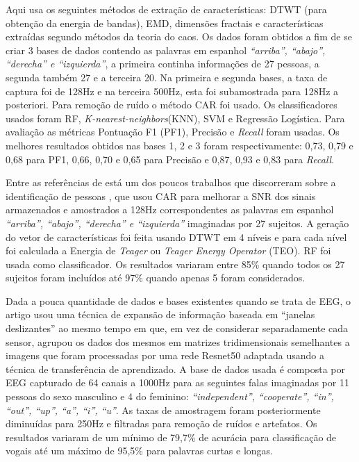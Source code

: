 			\par Aqui \cite{Hernandez-Del-ToroTonatiuh2021TaEB} usa os seguintes métodos de extração de características: DTWT (para obtenção da energia de bandas), EMD, dimensões fractais e características extraídas segundo métodos da teoria do caos. Os dados foram obtidos a fim de se criar 3 bases de dados contendo as palavras em espanhol \textit{``arriba'', ``abajo'', ``derecha'' e ``izquierda''}, a primeira continha informações de 27 pessoas, a segunda também 27 e a terceira 20. Na primeira e segunda bases, a taxa de captura foi de 128Hz e na terceira 500Hz, esta foi subamostrada para 128Hz a posteriori. Para remoção de ruído o método CAR foi usado. Os classificadores usados foram RF, \textit{K-nearest-neighbors}(KNN), SVM e Regressão Logística. Para avaliação as métricas Pontuação F1 (PF1), Precisão e \textit{Recall} foram usadas. Os melhores resultados obtidos nas bases 1, 2 e 3 foram respectivamente: 0,73, 0,79 e 0,68 para PF1, 0,66, 0,70 e 0,65 para Precisão e 0,87, 0,93 e 0,83 para \textit{Recall}.
			
			\par Entre as referências de  está um dos poucos trabalhos que discorreram sobre a identificação de pessoas \cite{MOCTEZUMA2019201}, que usou CAR para melhorar a SNR dos sinais armazenados e amostrados a 128Hz correspondentes as palavras em espanhol \textit{``arriba'', ``abajo'', ``derecha'' e ``izquierda''} imaginadas por 27 sujeitos. A geração do vetor de características foi feita usando DTWT em 4 níveis e para cada nível foi calculada a Energia de \textit{Teager} ou \textit{Teager Energy Operator} (TEO). RF foi usada como classificador. Os resultados variaram entre 85\% quando todos os 27 sujeitos foram incluídos até 97\% quando apenas 5 foram considerados.
			
			\par Dada a pouca quantidade de dados e bases existentes quando se trata de EEG, o artigo \cite{PanachakelJerrinRamakrishnan} usou uma técnica de expansão de informação baseada em ``janelas deslizantes'' ao mesmo tempo em que, em vez de considerar separadamente cada sensor, agrupou os dados dos mesmos em matrizes tridimensionais semelhantes a imagens que foram processadas por uma rede Resnet50 \cite{DBLP:journals/corr/HeZRS15} adaptada usando a técnica de transferência de aprendizado. A base de dados usada \cite{nguyen2018inferring} é composta por EEG capturado de 64 canais a 1000Hz para as seguintes falas imaginadas por 11 pessoas do sexo masculino e 4 do feminino: \textit{``independent'', ``cooperate'', ``in'', ``out'', ``up'', ``a'', ``i'', ``u''}. As taxas de amostragem foram posteriormente diminuídas para 250Hz e filtradas para remoção de ruídos e artefatos. Os resultados variaram de um mínimo de 79,7\% de acurácia para classificação de vogais até um máximo de 95,5\% para palavras curtas e longas.
			
